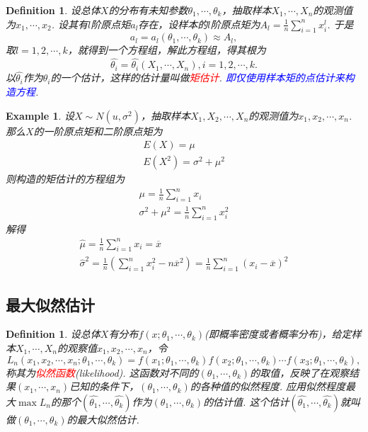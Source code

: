 \documentclass{article}
\newtheorem{example}[theorem]{Example}
\newtheorem{definition}[theorem]{Definition}
\newcommand{\redt}[1]{\textcolor{red}{#1}}
\newcommand{\bluet}[1]{\textcolor{blue}{#1}}
\begin{document}
\begin{definition}
\rm 设总体$X$的分布有未知参数$\theta_1,\cdots,\theta_k$，抽取样本$X_1,\cdots,X_n$的观测值为$x_1,\cdots,x_2$. 设其有$l$阶原点矩$a_l$存在，设样本的$l$阶原点矩为$A_l = \frac{1}{n}\sum\limits_{i = 1}^n x_i ^l$. 于是
$$
a_l = a_l(\theta_1,\cdots,\theta_k) \approx A_l,
$$
取$l=1,2,\cdots,k$，就得到一个方程组，解此方程组，得其根为
$$
\widehat{\theta_i} = \widehat{\theta_i}(X_1,\cdots,X_n),i=1,2,\cdots,k.
$$
以$\widehat{\theta_i}$作为$\theta_i$的一个估计，这样的估计量叫做\redt{矩估计}. \bluet{即仅使用样本矩的点估计来构造方程}. 
\end{definition}

\begin{example}
\rm 设$X \sim N(u,\sigma^2)$，抽取样本$X_1,X_2,\cdots,X_n$的观测值为$x_1,x_2,\cdots,x_n$. 那么$X$的一阶原点矩和二阶原点矩为
$$
\begin{array}{ll}
E(X) = \mu \\
E(X^2) = \sigma^2 + \mu^2
\end{array}
$$
则构造的矩估计的方程组为
$$
\begin{array}{ll}
\mu = \frac{1}{n}\sum\limits_{i = 1}^n x_i \\
\sigma^2 + \mu^2 = \frac{1}{n}\sum\limits_{i = 1}^n x_i^2 
\end{array}
$$
解得
$$
\begin{array}{ll}
\widehat{\mu} = \frac{1}{n}\sum\limits_{i = 1}^n x_i =\overline{x} \\
\widehat{\sigma}^2 = \frac{1}{n}\left(\sum\limits_{i = 1}^n x_i^2 - n\overline{x}^2 \right) = \frac{1}{n}  \sum\limits_{i = 1}^n (x_i - \overline{x})^2
\end{array}
$$
\end{example}

\subsection{最大似然估计}

\begin{definition}
\rm 设总体$X$有分布$f(x;\theta_1,\cdots,\theta_k)$(即概率密度或者概率分布)，给定样本$X_1,\cdots,X_n$的观察值$x_1,x_2,\cdots,x_n$，令
$$
L_n(x_1,x_2,\cdots,x_n;\theta_1,\cdots,\theta_k) = f(x_1;\theta_1,\cdots,\theta_k)f(x_2;\theta_1,\cdots,\theta_k)\cdots f(x_3;\theta_1,\cdots,\theta_k),
$$
称其为\redt{似然函数}(likelihood). 这函数对不同的$(\theta_1,\cdots,\theta_k)$的取值，反映了在观察结果$(x_1,\cdots,x_n)$已知的条件下，$(\theta_1,\cdots,\theta_k)$的各种值的似然程度. 应用似然程度最大$\max{L_n}$的那个$(\widehat{\theta_1},\cdots,\widehat{\theta_k})$作为$(\theta_1,\cdots,\theta_k)$的估计值. 这个估计$(\widehat{\theta_1},\cdots,\widehat{\theta_k})$就叫做$(\theta_1,\cdots,\theta_k)$的最大似然估计. 
\end{definition}
\end{document}
